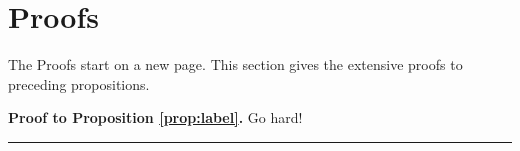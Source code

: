 \documentclass[
	12pt, %
	a4paper, %
	]{article}
\theoremstyle{break} %
\newenvironment{proof}[1][Proof]{\noindent\textbf{#1.}}{\ \rule{0.5em}{0.5em}}
\begin{document}
\singlespacing




\clearpage

\doublespacing
\appendix
\section{Proofs} \label{app:proofs}
The Proofs start on a new page.
This section gives the extensive proofs to preceding propositions.

\begin{proof}[Proof to Proposition \ref{prop:label}]
	Go hard!
\end{proof}
\end{document}
